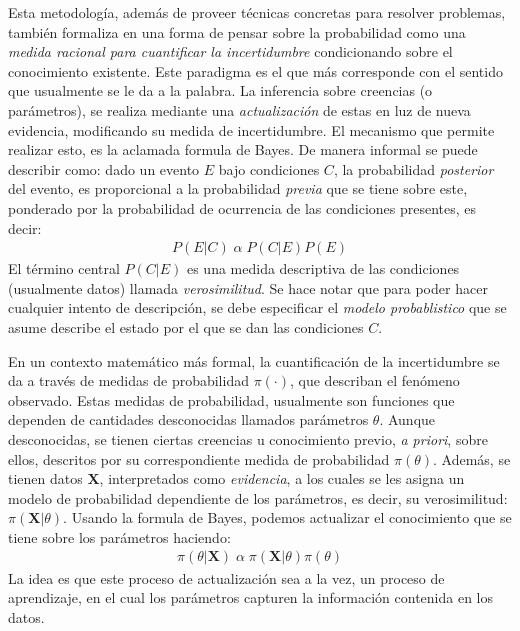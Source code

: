 \documentclass[../Main/Main.tex]{subfiles}
\begin{document}
Esta metodología, además de proveer técnicas concretas para resolver problemas, también formaliza en una forma de pensar sobre la probabilidad como una \textit{medida racional para cuantificar la incertidumbre} condicionando sobre el conocimiento existente. Este paradigma es el que más corresponde con el sentido que usualmente se le da a la palabra. La inferencia sobre creencias (o parámetros), se realiza mediante una \textit{actualización} de estas en luz de nueva evidencia, modificando su medida de incertidumbre. El mecanismo que permite realizar esto, es la aclamada formula de Bayes. De manera informal se puede describir como: dado un evento $E$ bajo condiciones $C$, la probabilidad \textit{posterior} del evento, es proporcional a la probabilidad \textit{previa} que se tiene sobre este, ponderado por la probabilidad de ocurrencia de las condiciones presentes, es decir: 
\begin{align}
P(E|C) \; \alpha \; P(C|E)P(E) \label{ec:BayesInformal}
\end{align}
El término central $P(C|E)$ es una medida descriptiva de las condiciones (usualmente datos) llamada \textit{verosimilitud}. Se hace notar que para poder hacer cualquier intento de descripción, se debe especificar el \textit{modelo probablistico} que se asume describe el estado por el que se dan las condiciones $C$. \

En un contexto matemático más formal, la cuantificación de la incertidumbre se da a través de medidas de probabilidad $\pi(\cdot)$, que describan el fenómeno observado. Estas medidas de probabilidad, usualmente son funciones que dependen de cantidades desconocidas llamados parámetros $\theta$. Aunque desconocidas, se tienen ciertas creencias u conocimiento previo, \textit{a priori}, sobre ellos, descritos por su correspondiente medida de probabilidad $\pi(\theta)$. Además, se tienen datos $\mathbf{X}$, interpretados como \textit{evidencia}, a los cuales se les asigna un modelo de probabilidad dependiente de los parámetros, es decir, su verosimilitud: $\pi(\mathbf{X}|\theta)$. Usando la formula de Bayes, podemos actualizar el conocimiento que se tiene sobre los parámetros haciendo:
\begin{align}
	\pi(\theta|\mathbf{X}) \; \alpha \; \pi(\mathbf{X}|\theta)\pi(\theta) \label{ec:BayesProporcional}
\end{align}
La idea es que este proceso de actualización sea a la vez, un proceso de aprendizaje, en el cual los parámetros capturen la información contenida en los datos.\\
\end{document}
